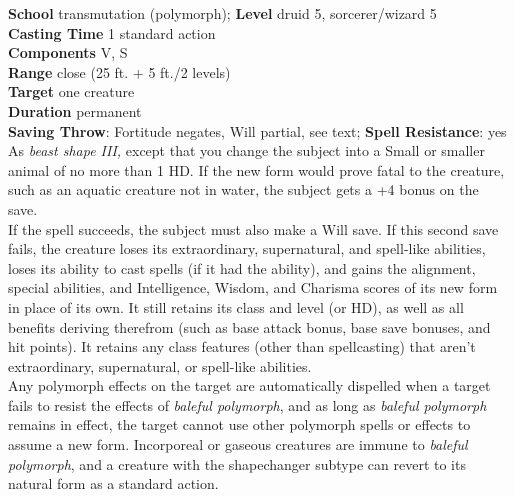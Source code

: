 \textbf{School} transmutation (polymorph); \textbf{Level} druid 5, sorcerer/wizard 5\\
\textbf{Casting Time }1 standard action\\
\textbf{Components }V, S\\
\textbf{Range }close (25 ft. + 5 ft./2 levels)\\
\textbf{Target }one creature\\
\textbf{Duration }permanent\\
\textbf{Saving Throw}: Fortitude negates, Will partial, see text; \textbf{Spell Resistance}: yes\\
As \textit{beast shape III, }except that you change the subject into a Small or smaller animal of no more than 1 HD. If the new form would prove fatal to the creature, such as an aquatic creature not in water, the subject gets a +4 bonus on the save.\\
If the spell succeeds, the subject must also make a Will save. If this second save fails, the creature loses its extraordinary, supernatural, and spell-like abilities, loses its ability to cast spells (if it had the ability), and gains the alignment, special abilities, and Intelligence, Wisdom, and Charisma scores of its new form in place of its own. It still retains its class and level (or HD), as well as all benefits deriving therefrom (such as base attack bonus, base save bonuses, and hit points). It retains any class features (other than spellcasting) that aren't extraordinary, supernatural, or spell-like abilities.\\
Any polymorph effects on the target are automatically dispelled when a target fails to resist the effects of \textit{baleful polymorph}, and as long as \textit{baleful polymorph} remains in effect, the target cannot use other polymorph spells or effects to assume a new form. Incorporeal or gaseous creatures are immune to \textit{baleful polymorph}, and a creature with the shapechanger subtype can revert to its natural form as a standard action.\\
